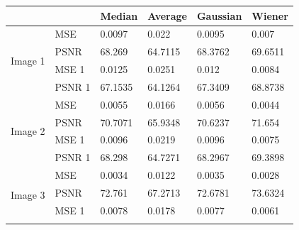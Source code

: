 \begin{center}
\begin{tabular}{|l|l|l|l|l|l|l|l|l|l|}
\hline
\multicolumn{2}{|l|}{}            & \multicolumn{2}{l|}{Median}  & \multicolumn{2}{l|}{Average} & \multicolumn{2}{l|}{Gaussian} & \multicolumn{2}{l|}{Wiener}  \\ \hline
\multirow{4}{*}{Image 1} & MSE    & \multicolumn{2}{l|}{0.0097}  & \multicolumn{2}{l|}{0.022}   & \multicolumn{2}{l|}{0.0095}   & \multicolumn{2}{l|}{0.007}   \\ \cline{2-10} 
                         & PSNR   & \multicolumn{2}{l|}{68.269}  & \multicolumn{2}{l|}{64.7115} & \multicolumn{2}{l|}{68.3762}  & \multicolumn{2}{l|}{69.6511} \\ \cline{2-10} 
                         & MSE 1  & \multicolumn{2}{l|}{0.0125}  & \multicolumn{2}{l|}{0.0251}  & \multicolumn{2}{l|}{0.012}    & \multicolumn{2}{l|}{0.0084}  \\ \cline{2-10} 
                         & PSNR 1 & \multicolumn{2}{l|}{67.1535} & \multicolumn{2}{l|}{64.1264} & \multicolumn{2}{l|}{67.3409}  & \multicolumn{2}{l|}{68.8738} \\ \hline
\multirow{4}{*}{Image 2} & MSE    & \multicolumn{2}{l|}{0.0055}  & \multicolumn{2}{l|}{0.0166}  & \multicolumn{2}{l|}{0.0056}   & \multicolumn{2}{l|}{0.0044}  \\ \cline{2-10} 
                         & PSNR   & \multicolumn{2}{l|}{70.7071} & \multicolumn{2}{l|}{65.9348} & \multicolumn{2}{l|}{70.6237}  & \multicolumn{2}{l|}{71.654}  \\ \cline{2-10} 
                         & MSE 1  & \multicolumn{2}{l|}{0.0096}  & \multicolumn{2}{l|}{0.0219}  & \multicolumn{2}{l|}{0.0096}   & \multicolumn{2}{l|}{0.0075}  \\ \cline{2-10} 
                         & PSNR 1 & \multicolumn{2}{l|}{68.298}  & \multicolumn{2}{l|}{64.7271} & \multicolumn{2}{l|}{68.2967}  & \multicolumn{2}{l|}{69.3898} \\ \hline
\multirow{4}{*}{Image 3} & MSE    & \multicolumn{2}{l|}{0.0034}  & \multicolumn{2}{l|}{0.0122}  & \multicolumn{2}{l|}{0.0035}   & \multicolumn{2}{l|}{0.0028}  \\ \cline{2-10} 
                         & PSNR   & \multicolumn{2}{l|}{72.761}  & \multicolumn{2}{l|}{67.2713} & \multicolumn{2}{l|}{72.6781}  & \multicolumn{2}{l|}{73.6324} \\ \cline{2-10} 
                         & MSE 1  & \multicolumn{2}{l|}{0.0078}  & \multicolumn{2}{l|}{0.0178}  & \multicolumn{2}{l|}{0.0077}   & \multicolumn{2}{l|}{0.0061}  \\ \cline{2-10} 

\end{tabular}
\end{center}

